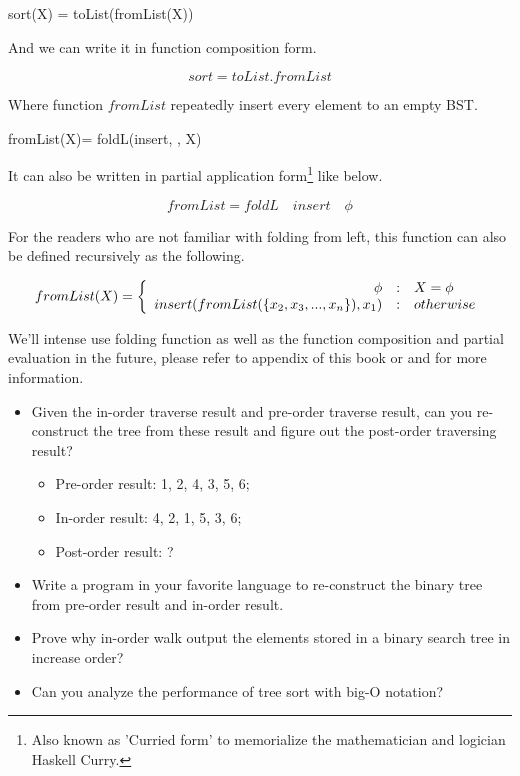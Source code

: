 \documentclass{article}
\begin{document}
\be
  sort(X) = toList(fromList(X))
\ee

And we can write it in function composition form.

\[
  sort = toList . fromList
\]

Where function $fromList$ repeatedly insert every element to an empty
BST.

\be
  fromList(X)= foldL(insert, \phi, X)
\ee

It can also be written in partial application form\footnote{Also known as 'Curried form' to memorialize the mathematician and logician Haskell Curry.} like below.

\[
  fromList = foldL \quad insert \quad \phi
\]

For the readers who are not familiar with folding from left, this function
can also be defined recursively as the following.

\[
fromList(X) = \left \{
  \begin{array}
  {r@{\quad:\quad}l}
  \phi & X = \phi \\
  insert(fromList(\{x_2, x_3, ..., x_n\}), x_1) & otherwise
  \end{array}
\right .
\]

We'll intense use folding function as well as the function composition
and partial evaluation in the future, please refer to appendix of this
book or \cite{wiki-fold}
\cite{func-composition} and \cite{curry} for more information.

\begin{Exercise}

\begin{itemize}
\item Given the in-order traverse result and pre-order traverse result,
can you re-construct the tree from these result and figure out the
post-order traversing result?

\begin{itemize}
\item Pre-order result: 1, 2, 4, 3, 5, 6;
\item In-order result: 4, 2, 1, 5, 3, 6;
\item Post-order result: ?
\end{itemize}

\item Write a program in your favorite language to re-construct
the binary tree from pre-order result and in-order result.

\item Prove why in-order walk output the elements stored in a binary
search tree in increase order?

\item Can you analyze the performance of tree sort with big-O notation?
\end{itemize}
\end{Exercise}
\end{document}
